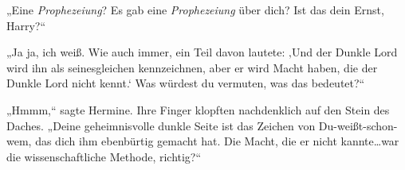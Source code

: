„Eine \emph{Prophezeiung}? Es gab eine \emph{Prophezeiung} über dich? Ist das dein Ernst, Harry?“

„Ja ja, ich weiß. Wie auch immer, ein Teil davon lautete: ‚Und der Dunkle Lord wird ihn als seinesgleichen kennzeichnen, aber er wird Macht haben, die der Dunkle Lord nicht kennt.‘ Was würdest du vermuten, was das bedeutet?“

„Hmmm,“ sagte Hermine. Ihre Finger klopften nachdenklich auf den Stein des Daches. „Deine geheimnisvolle dunkle Seite ist das Zeichen von Du-weißt-schon-wem, das dich ihm ebenbürtig gemacht hat. Die Macht, die er nicht kannte…war die wissenschaftliche Methode, richtig?“

